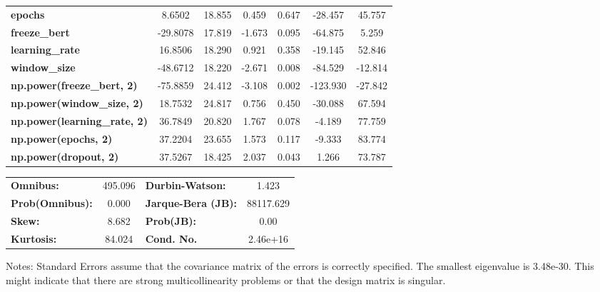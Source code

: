 \begin{center}
\begin{tabular}{lcccccc}
\textbf{epochs}                            &       8.6502  &       18.855     &     0.459  &         0.647        &      -28.457    &       45.757     \\
\textbf{freeze\_bert}                      &     -29.8078  &       17.819     &    -1.673  &         0.095        &      -64.875    &        5.259     \\
\textbf{learning\_rate}                    &      16.8506  &       18.290     &     0.921  &         0.358        &      -19.145    &       52.846     \\
\textbf{window\_size}                      &     -48.6712  &       18.220     &    -2.671  &         0.008        &      -84.529    &      -12.814     \\
\textbf{np.power(freeze\_bert, 2)}         &     -75.8859  &       24.412     &    -3.108  &         0.002        &     -123.930    &      -27.842     \\
\textbf{np.power(window\_size, 2)}         &      18.7532  &       24.817     &     0.756  &         0.450        &      -30.088    &       67.594     \\
\textbf{np.power(learning\_rate, 2)}       &      36.7849  &       20.820     &     1.767  &         0.078        &       -4.189    &       77.759     \\
\textbf{np.power(epochs, 2)}               &      37.2204  &       23.655     &     1.573  &         0.117        &       -9.333    &       83.774     \\
\textbf{np.power(dropout, 2)}              &      37.5267  &       18.425     &     2.037  &         0.043        &        1.266    &       73.787     \\
\bottomrule
\end{tabular}
\begin{tabular}{lclc}
\textbf{Omnibus:}       & 495.096 & \textbf{  Durbin-Watson:     } &     1.423  \\
\textbf{Prob(Omnibus):} &   0.000 & \textbf{  Jarque-Bera (JB):  } & 88117.629  \\
\textbf{Skew:}          &   8.682 & \textbf{  Prob(JB):          } &      0.00  \\
\textbf{Kurtosis:}      &  84.024 & \textbf{  Cond. No.          } &  2.46e+16  \\
\bottomrule
\end{tabular}
\end{center}

Notes: \newline
 [1] Standard Errors assume that the covariance matrix of the errors is correctly specified. \newline
 [2] The smallest eigenvalue is 3.48e-30. This might indicate that there are \newline
 strong multicollinearity problems or that the design matrix is singular.